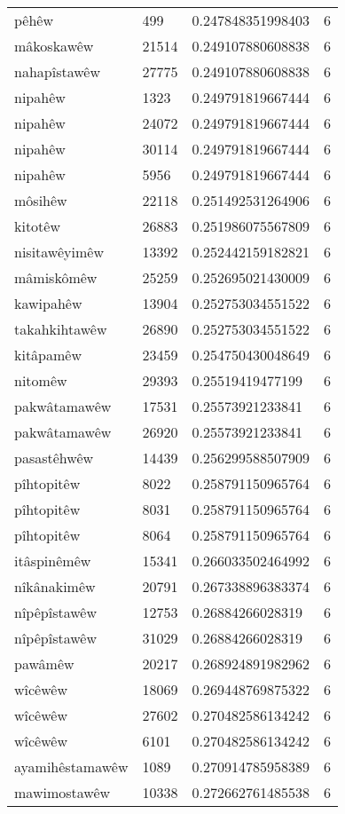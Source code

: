 \begin{longtable}{llll}
pêhêw & 499 & 0.247848351998403 & 6\\
mâkoskawêw & 21514 & 0.249107880608838 & 6\\
nahapîstawêw & 27775 & 0.249107880608838 & 6\\
nipahêw & 1323 & 0.249791819667444 & 6\\
nipahêw & 24072 & 0.249791819667444 & 6\\
nipahêw & 30114 & 0.249791819667444 & 6\\
nipahêw & 5956 & 0.249791819667444 & 6\\
môsihêw & 22118 & 0.251492531264906 & 6\\
kitotêw & 26883 & 0.251986075567809 & 6\\
nisitawêyimêw & 13392 & 0.252442159182821 & 6\\
mâmiskômêw & 25259 & 0.252695021430009 & 6\\
kawipahêw & 13904 & 0.252753034551522 & 6\\
takahkihtawêw & 26890 & 0.252753034551522 & 6\\
kitâpamêw & 23459 & 0.254750430048649 & 6\\
nitomêw & 29393 & 0.25519419477199 & 6\\
pakwâtamawêw & 17531 & 0.25573921233841 & 6\\
pakwâtamawêw & 26920 & 0.25573921233841 & 6\\
pasastêhwêw & 14439 & 0.256299588507909 & 6\\
pîhtopitêw & 8022 & 0.258791150965764 & 6\\
pîhtopitêw & 8031 & 0.258791150965764 & 6\\
pîhtopitêw & 8064 & 0.258791150965764 & 6\\
itâspinêmêw & 15341 & 0.266033502464992 & 6\\
nîkânakimêw & 20791 & 0.267338896383374 & 6\\
nîpêpîstawêw & 12753 & 0.26884266028319 & 6\\
nîpêpîstawêw & 31029 & 0.26884266028319 & 6\\
pawâmêw & 20217 & 0.268924891982962 & 6\\
wîcêwêw & 18069 & 0.269448769875322 & 6\\
wîcêwêw & 27602 & 0.270482586134242 & 6\\
wîcêwêw & 6101 & 0.270482586134242 & 6\\
ayamihêstamawêw & 1089 & 0.270914785958389 & 6\\
mawimostawêw & 10338 & 0.272662761485538 & 6\\

\end{longtable}
